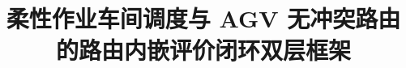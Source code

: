\documentclass[manuscript,screen,review]{acmart}
\newcommand{\NCases}{10}
\newcommand{\GainLoopRule}{18.86\%}      %
\newcommand{\GainProbeLoop}{2.45\%}      %
\newcommand{\CellsSigLoopAdj}{9}
\newcommand{\GainPrune}{5.60\%}
\newcommand{\WinPrune}{50}
\newcommand{\LosePrune}{0}
\begin{document}
\title[路由内嵌评价闭环双层框架]{柔性作业车间调度与 AGV 无冲突路由的路由内嵌评价闭环双层框架}
\end{document}

